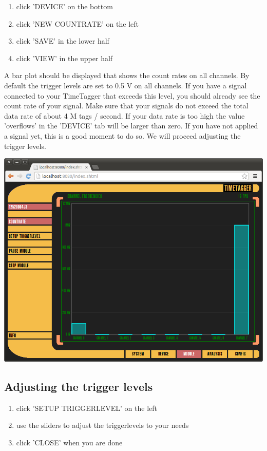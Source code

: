\documentclass[oneside]{memoir}
\begin{document}
\begin{enumerate}
 \item click 'DEVICE' on the bottom
 \item click 'NEW COUNTRATE' on the left
 \item click 'SAVE' in the lower half
 \item click 'VIEW' in the upper half
\end{enumerate}
A bar plot should be displayed that shows the count rates on all channels. By default the trigger levels are set to
0.5 V on all channels. If you have a signal connected to your TimeTagger that exceeds this level, you
should already see the count rate of your signal. Make sure that your signals do not exceed the total data rate of
about 4 M tags / second. If your data rate is too high the value 'overflows' in the 'DEVICE' tab will be larger than
zero. If you have not applied a signal yet, this is a good moment to do so. We will proceed adjusting the trigger
levels.
\begin{center}
\includegraphics[scale=0.4]{figures/countrate.png}
\end{center}

\subsection{Adjusting the trigger levels}

\begin{enumerate}
 \item click 'SETUP TRIGGERLEVEL' on the left
 \item use the sliders to adjust the triggerlevels to your needs
 \item click 'CLOSE' when you are done
\end{enumerate}
\end{document}
